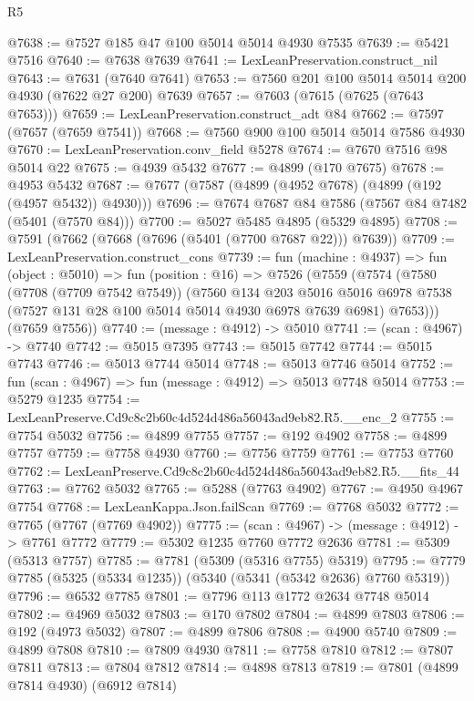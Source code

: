 \begin{lexlean}{R5}
\begin{coremodule}
@7638 := @7527 @185 @47 @100 @5014 @5014 @4930 @7535
@7639 := @5421 @7516
@7640 := @7638 @7639
@7641 := LexLeanPreservation.construct_nil
@7643 := @7631 (@7640 @7641)
@7653 := @7560 @201 @100 @5014 @5014 @200 @4930 (@7622 @27 @200) @7639
@7657 := @7603 (@7615 (@7625 (@7643 @7653)))
@7659 := LexLeanPreservation.construct_adt @84
@7662 := @7597 (@7657 (@7659 @7541))
@7668 := @7560 @900 @100 @5014 @5014 @7586 @4930
@7670 := LexLeanPreservation.conv_field @5278
@7674 := @7670 @7516 @98 @5014 @22
@7675 := @4939 @5432
@7677 := @4899 (@170 @7675)
@7678 := @4953 @5432
@7687 := @7677 (@7587 (@4899 (@4952 @7678) (@4899 (@192 (@4957 @5432)) @4930)))
@7696 := @7674 @7687 @84 @7586 (@7567 @84 @7482 (@5401 (@7570 @84)))
@7700 := @5027 @5485 @4895 (@5329 @4895)
@7708 := @7591 (@7662 (@7668 (@7696 (@5401 (@7700 @7687 @22))) @7639))
@7709 := LexLeanPreservation.construct_cons
@7739 := fun (machine : @4937) =>
  fun (object : @5010) =>
  fun (position : @16) =>
  @7526
    (@7559
      (@7574
        (@7580
          (@7708 (@7709 @7542 @7549))
          (@7560
            @134
            @203
            @5016
            @5016
            @6978
            @7538
            (@7527 @131 @28 @100 @5014 @5014 @4930 @6978 @7639 @6981)
            @7653)))
      (@7659 @7556))
@7740 := (message : @4912) -> @5010
@7741 := (scan : @4967) -> @7740
@7742 := @5015 @7395
@7743 := @5015 @7742
@7744 := @5015 @7743
@7746 := @5013 @7744 @5014
@7748 := @5013 @7746 @5014
@7752 := fun (scan : @4967) => fun (message : @4912) => @5013 @7748 @5014
@7753 := @5279 @1235
@7754 := LexLeanPreserve.Cd9c8c2b60c4d524d486a56043ad9eb82.R5.__enc_2
@7755 := @7754 @5032
@7756 := @4899 @7755
@7757 := @192 @4902
@7758 := @4899 @7757
@7759 := @7758 @4930
@7760 := @7756 @7759
@7761 := @7753 @7760
@7762 := LexLeanPreserve.Cd9c8c2b60c4d524d486a56043ad9eb82.R5.__fits_44
@7763 := @7762 @5032
@7765 := @5288 (@7763 @4902)
@7767 := @4950 @4967 @7754
@7768 := LexLeanKappa.Json.failScan
@7769 := @7768 @5032
@7772 := @7765 (@7767 (@7769 @4902))
@7775 := (scan : @4967) -> (message : @4912) -> @7761 @7772
@7779 := @5302 @1235 @7760 @7772 @2636
@7781 := @5309 (@5313 @7757)
@7785 := @7781 (@5309 (@5316 @7755) @5319)
@7795 := @7779 @7785 (@5325 (@5334 @1235)) (@5340 (@5341 (@5342 @2636) @7760 @5319))
@7796 := @6532 @7785
@7801 := @7796 @113 @1772 @2634 @7748 @5014
@7802 := @4969 @5032
@7803 := @170 @7802
@7804 := @4899 @7803
@7806 := @192 (@4973 @5032)
@7807 := @4899 @7806
@7808 := @4900 @5740
@7809 := @4899 @7808
@7810 := @7809 @4930
@7811 := @7758 @7810
@7812 := @7807 @7811
@7813 := @7804 @7812
@7814 := @4898 @7813
@7819 := @7801 (@4899 @7814 @4930) (@6912 @7814)

\end{coremodule}
\end{lexlean}
